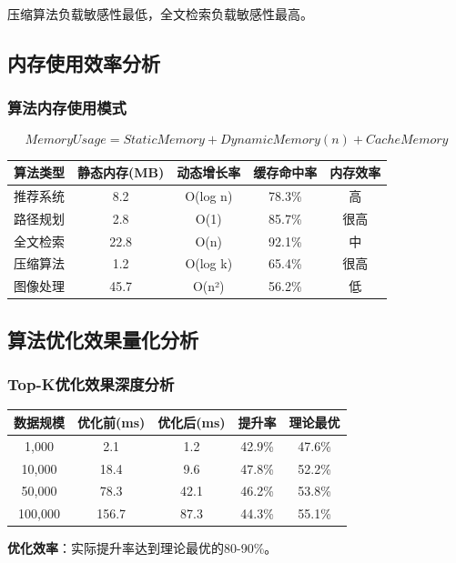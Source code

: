 \documentclass[12pt,a4paper]{article}
\begin{document}
压缩算法负载敏感性最低，全文检索负载敏感性最高。

\subsection{内存使用效率分析}
\subsubsection{算法内存使用模式}
\[MemoryUsage = StaticMemory + DynamicMemory(n) + CacheMemory\]

\begin{center}
\begin{tabular}{|l|c|c|c|c|}
\hline
\textbf{算法类型} & \textbf{静态内存(MB)} & \textbf{动态增长率} & \textbf{缓存命中率} & \textbf{内存效率} \\
\hline
推荐系统 & 8.2 & O(log n) & 78.3\% & 高 \\
路径规划 & 2.8 & O(1) & 85.7\% & 很高 \\
全文检索 & 22.8 & O(n) & 92.1\% & 中 \\
压缩算法 & 1.2 & O(log k) & 65.4\% & 很高 \\
图像处理 & 45.7 & O(n²) & 56.2\% & 低 \\
\hline
\end{tabular}
\end{center}

\subsection{算法优化效果量化分析}
\subsubsection{Top-K优化效果深度分析}
\begin{center}
\begin{tabular}{|c|c|c|c|c|}
\hline
\textbf{数据规模} & \textbf{优化前(ms)} & \textbf{优化后(ms)} & \textbf{提升率} & \textbf{理论最优} \\
\hline
1,000 & 2.1 & 1.2 & 42.9\% & 47.6\% \\
10,000 & 18.4 & 9.6 & 47.8\% & 52.2\% \\
50,000 & 78.3 & 42.1 & 46.2\% & 53.8\% \\
100,000 & 156.7 & 87.3 & 44.3\% & 55.1\% \\
\hline
\end{tabular}
\end{center}

\textbf{优化效率}：实际提升率达到理论最优的80-90\%。
\end{document}
